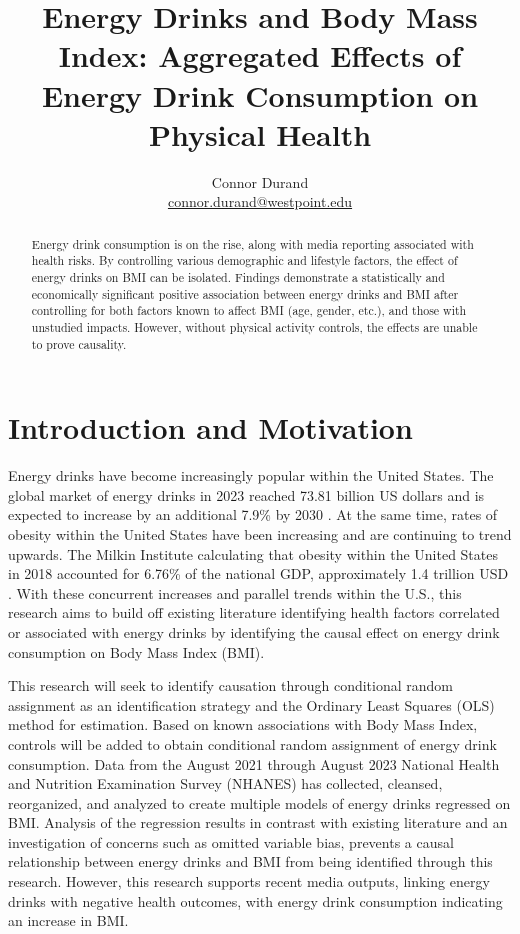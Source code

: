 \documentclass[12pt]{article}
\title{Energy Drinks and Body Mass Index: Aggregated Effects of Energy Drink Consumption on Physical Health}
\author{Connor Durand \\ \href{mailto:connor.durand@westpoint.edu}{connor.durand@westpoint.edu}}
\date{}
\begin{document}
\maketitle

\begin{abstract}
Energy drink consumption is on the rise, along with media reporting associated with health risks. By controlling various demographic and lifestyle factors, the effect of energy drinks on BMI can be isolated. Findings demonstrate a statistically and economically significant positive association between energy drinks and BMI after controlling for both factors known to affect BMI (age, gender, etc.), and those with unstudied impacts. However, without physical activity controls, the effects are unable to prove causality.
\end{abstract}

\newpage

\section{Introduction and Motivation}

Energy drinks have become increasingly popular within the United States. The global market of energy drinks in 2023 reached 73.81 billion US dollars and is expected to increase by an additional 7.9\% by 2030 \citep{grandview2024}. At the same time, rates of obesity within the United States have been increasing and are continuing to trend upwards. The Milkin Institute calculating that obesity within the United States in 2018 accounted for 6.76\% of the national GDP, approximately 1.4 trillion USD \citep{lopez2020}. With these concurrent increases and parallel trends within the U.S., this research aims to build off existing literature identifying health factors correlated or associated with energy drinks by identifying the causal effect on energy drink consumption on Body Mass Index (BMI).

This research will seek to identify causation through conditional random assignment as an identification strategy and the Ordinary Least Squares (OLS) method for estimation. Based on known associations with Body Mass Index, controls will be added to obtain conditional random assignment of energy drink consumption. Data from the August 2021 through August 2023 National Health and Nutrition Examination Survey (NHANES) has collected, cleansed, reorganized, and analyzed to create multiple models of energy drinks regressed on BMI. Analysis of the regression results in contrast with existing literature and an investigation of concerns such as omitted variable bias, prevents a causal relationship between energy drinks and BMI from being identified through this research. However, this research supports recent media outputs, linking energy drinks with negative health outcomes, with energy drink consumption indicating an increase in BMI.
\end{document}
